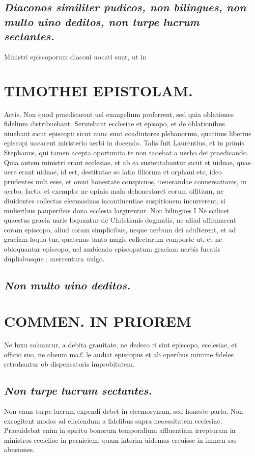 \documentclass{article}
\begin{document}
\begin{pages}
\subsection*{\textit{Diaconos similiter pudicos, non bilingues, non multo uino deditos, non turpe lucrum sectantes. }}\pstart Ministri episcoporum diaconi uocati sunt, ut in  \pend
\section*{TIMOTHEI EPISTOLAM. }
\marginpar{[ p.81 ]}\pstart Actis. Non quod praedicarent uel euangelium proferrent, sed quia oblationes fidelium distribuebant. Seruiebant ecclesiae et episopo, et de oblationibus uiuebant sicut episcopi: sicut nunc sunt coadiutores plebanorum, quatinus liberius episcopi uacarent miristerio uerbi in docendo. Talis fuit Laurentius, et in primis Stephanus, qui tamen acepta oportunita te non taoebat a uerbo dei praedicando. Quia autem ministri erant ecclesiae, et ab ea sustentabantur sicut et uiduae, quae uere erant uiduae, id est, destitutae so latio filiorum et orphani etc, ideo prudentes uult esse, et omni honestate conspicuos, uenerandae conuersationis, in uerbo, facto, et exemplo: ne opinio mala dehonestaret eorum offitium, ne diuidentes collectas eleemosinas incontinentiae suspitionem incurrerent, si mulieribus pauperibus dona ecclesia largirentur.  \pend\pstart Non bilingues I Ne scilicet quaestus gracia uarie loquantur de Christianis dogmatis, ne aliud affirmarent coram episcopo, aliud coram simplicibus, neque uerbum dei adulterent, et ad graciam loqua tur, quatenus tanto magis collectarum comporte ut, et ne obloquantur episcopo, uel ambiendo episcopatum graciam uerbis fucatis dupliabusque ; mercentura uulgo.  \pend
{}
{}
\subsection*{\textit{Non multo uino deditos. }}
\section*{COMMEN. IN PRIOREM }
\marginpar{[ p.82 ]}\pstart Ne luxu soluantur, a debita grauitate, ne dedeco ri sint episcopo, ecclesiae, et officio suo, ne obeum ma£ le audiat episcopus et ab operibus minime fideles retrahantur ob dispensatoris improbitatem.  \pend
{}
{}
\subsection*{\textit{Non turpe lucrum sectantes. }}\pstart Non enun turpe lucrum expendi debet in eleemosynam, sed honeste parta. Non excogitent modos ad eliciendum a fidelibus supra neoessitatem ecclesiae. Praeuidebat enim in spiritu bonorum temporalium affluentiam irrepturam in ministros ecclefiae in perniciem, quam interim uidemus creuisse in immen sas abusiones.  \pend
{}
{}

\end{pages}
\end{document}
